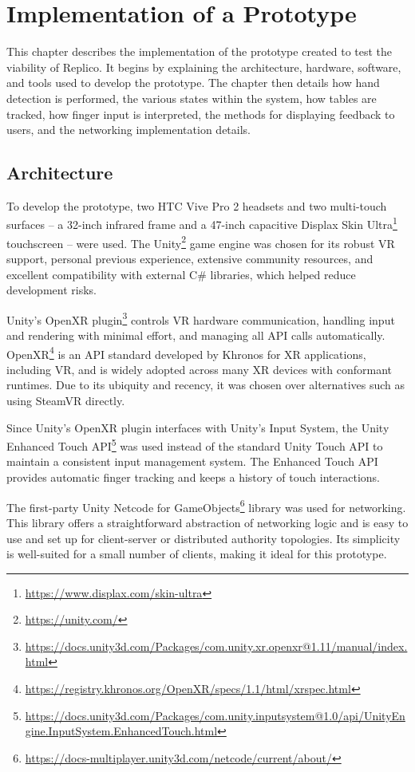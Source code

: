 \chapter{Implementation of a Prototype}\label{chap:prototype}

This chapter describes the implementation of the prototype created to test the viability of Replico. It begins by explaining the architecture, hardware, software, and tools used to develop the prototype. The chapter then details how hand detection is performed, the various states within the system, how tables are tracked, how finger input is interpreted, the methods for displaying feedback to users, and the networking implementation details.

\section{Architecture}
    
    To develop the prototype, two HTC Vive Pro 2 headsets and two multi-touch surfaces -- a 32-inch infrared frame and a 47-inch capacitive Displax Skin Ultra\footnote{\url{https://www.displax.com/skin-ultra} } touchscreen -- were used. The Unity\footnote{\url{https://unity.com/}} game engine was chosen for its robust VR support, personal previous experience, extensive community resources, and excellent compatibility with external C\# libraries, which helped reduce development risks.
    
    Unity's OpenXR plugin\footnote{\url{https://docs.unity3d.com/Packages/com.unity.xr.openxr@1.11/manual/index.html}} controls VR hardware communication, handling input and rendering with minimal effort, and managing all API calls automatically. OpenXR\footnote{\url{https://registry.khronos.org/OpenXR/specs/1.1/html/xrspec.html}} is an API standard developed by Khronos for XR applications, including VR, and is widely adopted across many XR devices with conformant runtimes. Due to its ubiquity and recency, it was chosen over alternatives such as using SteamVR directly.

    Since Unity's OpenXR plugin interfaces with Unity's Input System, the Unity Enhanced Touch API\footnote{\url{https://docs.unity3d.com/Packages/com.unity.inputsystem@1.0/api/UnityEngine.InputSystem.EnhancedTouch.html}} was used instead of the standard Unity Touch API to maintain a consistent input management system. The Enhanced Touch API provides automatic finger tracking and keeps a history of touch interactions.

    The first-party Unity Netcode for GameObjects\footnote{\url{https://docs-multiplayer.unity3d.com/netcode/current/about/}} library was used for networking. This library offers a straightforward abstraction of networking logic and is easy to use and set up for client-server or distributed authority topologies. Its simplicity is well-suited for a small number of clients, making it ideal for this prototype.


